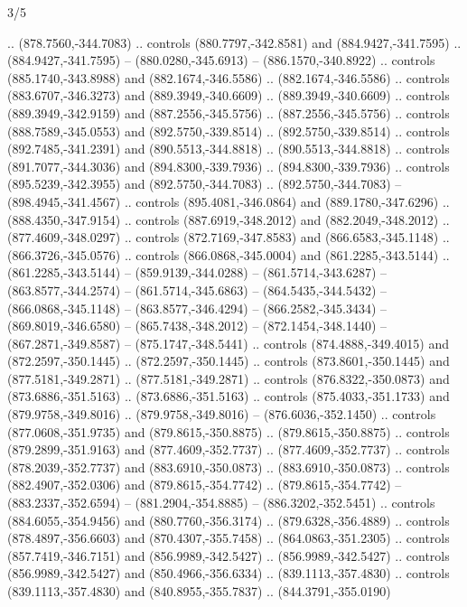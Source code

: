 \begin{flagdescription}{3/5}
\begin{scope}[xshift=0.5\flaglength,yshift=0.5\flagwidth,scale=\flagwidth/99]
\begin{scope}[y=0.8pt, x=0.8pt, yscale=-0.20628, xscale=0.20628,shift={(-500,-300)}]
\begin{scope}[cm={{0.79646,0.0,0.0,0.7753,(100.0721,273.79617)}}]
\begin{scope}[cm={{1.08438,0.0,0.0,1.08438,(-425.76596,333.57046)}}]
  .. (878.7560,-344.7083) .. controls (880.7797,-342.8581) and
  (884.9427,-341.7595) .. (884.9427,-341.7595) -- (880.0280,-345.6913) --
  (886.1570,-340.8922) .. controls (885.1740,-343.8988) and (882.1674,-346.5586)
  .. (882.1674,-346.5586) .. controls (883.6707,-346.3273) and
  (889.3949,-340.6609) .. (889.3949,-340.6609) .. controls (889.3949,-342.9159)
  and (887.2556,-345.5756) .. (887.2556,-345.5756) .. controls
  (888.7589,-345.0553) and (892.5750,-339.8514) .. (892.5750,-339.8514) ..
  controls (892.7485,-341.2391) and (890.5513,-344.8818) .. (890.5513,-344.8818)
  .. controls (891.7077,-344.3036) and (894.8300,-339.7936) ..
  (894.8300,-339.7936) .. controls (895.5239,-342.3955) and (892.5750,-344.7083)
  .. (892.5750,-344.7083) -- (898.4945,-341.4567) .. controls
  (895.4081,-346.0864) and (889.1780,-347.6296) .. (888.4350,-347.9154) ..
  controls (887.6919,-348.2012) and (882.2049,-348.2012) .. (877.4609,-348.0297)
  .. controls (872.7169,-347.8583) and (866.6583,-345.1148) ..
  (866.3726,-345.0576) .. controls (866.0868,-345.0004) and (861.2285,-343.5144)
  .. (861.2285,-343.5144) -- (859.9139,-344.0288) -- (861.5714,-343.6287) --
  (863.8577,-344.2574) -- (861.5714,-345.6863) -- (864.5435,-344.5432) --
  (866.0868,-345.1148) -- (863.8577,-346.4294) -- (866.2582,-345.3434) --
  (869.8019,-346.6580) -- (865.7438,-348.2012) -- (872.1454,-348.1440) --
  (867.2871,-349.8587) -- (875.1747,-348.5441) .. controls (874.4888,-349.4015)
  and (872.2597,-350.1445) .. (872.2597,-350.1445) .. controls
  (873.8601,-350.1445) and (877.5181,-349.2871) .. (877.5181,-349.2871) ..
  controls (876.8322,-350.0873) and (873.6886,-351.5163) .. (873.6886,-351.5163)
  .. controls (875.4033,-351.1733) and (879.9758,-349.8016) ..
  (879.9758,-349.8016) -- (876.6036,-352.1450) .. controls (877.0608,-351.9735)
  and (879.8615,-350.8875) .. (879.8615,-350.8875) .. controls
  (879.2899,-351.9163) and (877.4609,-352.7737) .. (877.4609,-352.7737) ..
  controls (878.2039,-352.7737) and (883.6910,-350.0873) .. (883.6910,-350.0873)
  .. controls (882.4907,-352.0306) and (879.8615,-354.7742) ..
  (879.8615,-354.7742) -- (883.2337,-352.6594) -- (881.2904,-354.8885) --
  (886.3202,-352.5451) .. controls (884.6055,-354.9456) and (880.7760,-356.3174)
  .. (879.6328,-356.4889) .. controls (878.4897,-356.6603) and
  (870.4307,-355.7458) .. (864.0863,-351.2305) .. controls (857.7419,-346.7151)
  and (856.9989,-342.5427) .. (856.9989,-342.5427) .. controls
  (856.9989,-342.5427) and (850.4966,-356.6334) .. (839.1113,-357.4830) ..
  controls (839.1113,-357.4830) and (840.8955,-355.7837) .. (844.3791,-355.0190)

\end{scope}
\end{scope}
\end{scope}
\end{scope}
\end{flagdescription}
